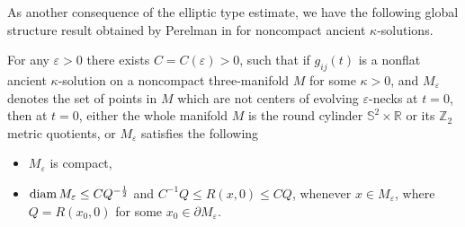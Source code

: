 As another consequence of the elliptic type estimate, we have the
following global structure result obtained by Perelman in
\cite{P1} for noncompact ancient $\kappa$-solutions.

\begin{corollary} 
  \label{cor:cz-noncompact-ancient-cap-neck-structure}

For any $\varepsilon>0$ there exists $C=C(\varepsilon)>0$, such
that if $g_{ij}(t)$ is a nonflat ancient $\kappa$-solution on a
noncompact three-manifold $M$ for some $\kappa>0$, and
$M_\varepsilon$ denotes the set of points in $M$ which are not
centers of evolving $\varepsilon$-necks at $t=0$, then at $t=0$,
either the whole manifold $M$ is the round cylinder $\mathbb{S}^2
\times \mathbb{R}$ or its $\mathbb{Z}_2$ metric quotients, or
$M_\varepsilon$ satisfies the following
\begin{itemize}
\item[(i)] $M_\varepsilon$ is compact, \item[(ii)] ${\rm diam}\,
M_\varepsilon \le CQ^{-\frac{1}{2}}$ and $C^{-1}Q\le R(x,0)\le
CQ$, whenever $x\in M_\varepsilon$, where $Q=R(x_0,0)$ for some
$x_0\in\partial M_\varepsilon$.
\end{itemize}
\end{corollary}

